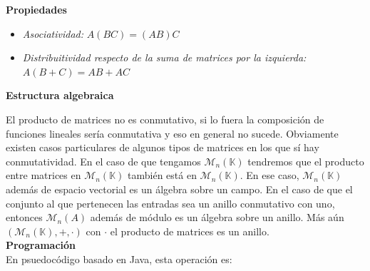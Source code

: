 \documentclass[10pt]{article}
\begin{document}
\noindent\textbf{Propiedades}

\begin{itemize}
\item \textit{Asociatividad:} $A(BC) = (AB)C$
\item \textit{Distribuitividad respecto de la suma de matrices por la izquierda:} $A(B+C) = AB + AC$
\end{itemize}


\noindent\textbf{Estructura algebraica}

El producto de matrices no es conmutativo, si lo fuera la composición de funciones lineales sería conmutativa y eso en general no sucede. Obviamente existen casos particulares de algunos tipos de matrices en los que sí hay conmutatividad. En el caso de que tengamos $\mathcal{M}_n(\mathbb{K})$ tendremos que el producto entre matrices en $\mathcal{M}_n(\mathbb{K})$ también está en $\mathcal{M}_n(\mathbb{K})$. En ese caso, $\mathcal{M}_n(\mathbb{K})$ además de espacio vectorial es un álgebra sobre un campo. En el caso de que el conjunto al que pertenecen las entradas sea un anillo conmutativo con uno, entonces $\mathcal{M}_n(A)$ además de módulo es un álgebra sobre un anillo. Más aún $(\mathcal{M}_n(\mathbb{K}), +, \cdot)$ con $\cdot$ el producto de matrices es un anillo. \\

\noindent\textbf{Programación} \\

En psuedocódigo basado en Java, esta operación es:
\end{document}
